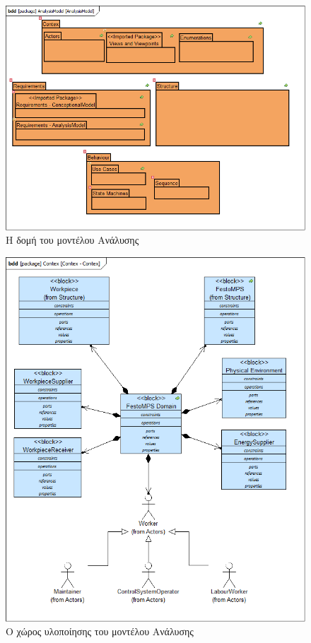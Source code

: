 \documentclass[a4paper,12pt,twoside]{report}
\begin{document}
\begin{appendices}
			\clearpage
				\begin{figure}[hp]
					\centering
					\includegraphics[scale=0.45]{AnalysisModel_AnalysisModel.png}
					\caption{Η δομή του μοντέλου Ανάλυσης}
					\label{φωτ:Η δομή του μοντέλου Ανάλυσης}
				\end{figure}
				
				\begin{figure}[hp]
					\centering
					\includegraphics[scale=0.45]{AnalysisModel_Contex-Contex.png}
					\caption{Ο χώρος υλοποίησης του μοντέλου Ανάλυσης}
					\label{φωτ:Ο χώρος υλοποίησης του μοντέλου Ανάλυσης}
				\end{figure}
				

\end{appendices}
\end{document}
